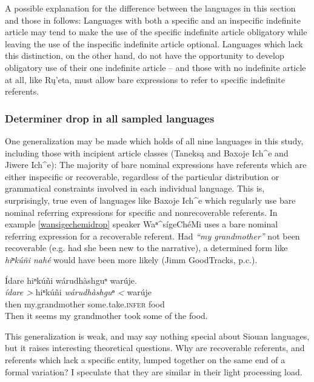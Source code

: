 \documentclass[output=paper]{LSP/langsci}
\begin{document}
A possible explanation for the difference between the languages in this section and those in  follows: Languages with both a specific and an inspecific indefinite article may tend to make the use of the specific indefinite article obligatory while leaving the use of the inspecific indefinite article optional. Languages which lack this distinction, on the other hand, do not have the opportunity to develop obligatory use of their one indefinite article -- and those with no indefinite article at all, like Rų’eta, must allow bare expressions to refer to specific indefinite referents.

\subsubsection{Determiner drop in all sampled languages}\label{dropsummary}

One generalization may be made which holds of all nine languages in this study, including those with incipient article classes (Taneksą and Baxoje Ich\^{}e and Jiwere Ich\^{}e): The majority of bare nominal expressions have referents which are either inspecific or recoverable, regardless of the particular distribution or grammatical constraints involved in each individual language. This is, surprisingly, true even of languages like Baxoje Ich\^{}e which regularly use bare nominal referring expressions for specific and nonrecoverable referents. In example \ref{wansigechemidrop} speaker Waⁿ\^{}sígeChéMi uses a bare nominal referring expression for a recoverable referent. Had \emph{“my grandmother”} not been recoverable (e.g. had she been new to the narrative), a determined form like \emph{hiⁿkúñi nahé} would have been more likely (Jimm GoodTracks, p.c.).

\ea\label{wansigechemidrop}
Ídare hiⁿkúñi wárudhàshguⁿ warúje.\footnotemark\\
\gll	\emph{ídare >} 		hiⁿkúñi 				\emph{wárudhàshguⁿ <}	warúje\\
	then 				my.grandmother 			some.take.\textsc{infer}	food\\
\glt	Then it seems my grandmother took some of the food.
\z

This generalization is weak, and may say nothing special about Siouan languages, but it raises interesting theoretical questions. Why are recoverable referents, and referents which lack a specific entity, lumped together on the same end of a formal variation? I speculate that they are similar in their light processing load.
\end{document}
